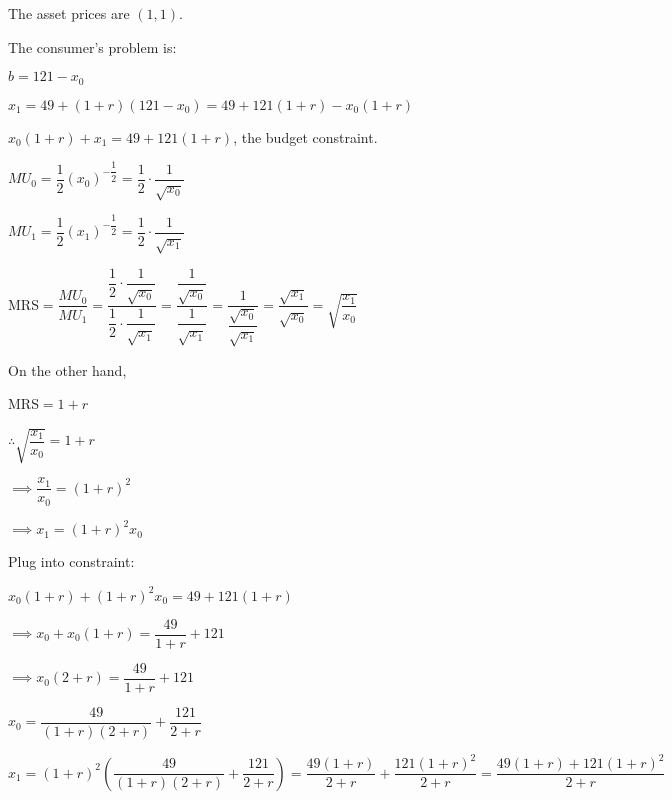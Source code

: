\documentclass{article}
\begin{document}
The asset prices are $(1,1)$.

The consumer's problem is:


$b=121-x_{0}$

$x_{1}=49+\left(1+r\right)\left(121-x_{0}\right)=49+121\left(1+r\right)-x_{0}\left(1+r\right)$

$x_{0}\left(1+r\right)+x_{1}=49+121\left(1+r\right)$, the budget constraint.

$MU_{0}=\dfrac{1}{2}\left(x_{0}\right)^{-\dfrac{1}{2}}=\dfrac{1}{2}\cdot\dfrac{1}{\sqrt{x_{0}}}$

$MU_{1}=\dfrac{1}{2}\left(x_{1}\right)^{-\dfrac{1}{2}}=\dfrac{1}{2}\cdot\dfrac{1}{\sqrt{x_{1}}}$

MRS$=\dfrac{MU_{0}}{MU_{1}}=\dfrac{\dfrac{1}{2}\cdot\dfrac{1}{\sqrt{x_{0}}}}{\dfrac{1}{2}\cdot\dfrac{1}{\sqrt{x_{1}}}}=\dfrac{\dfrac{1}{\sqrt{x_{0}}}}{\dfrac{1}{\sqrt{x_{1}}}}=\dfrac{1}{\dfrac{\sqrt{x_{0}}}{\sqrt{x_{1}}}}=\dfrac{\sqrt{x_{1}}}{\sqrt{x_{0}}}=\sqrt{\dfrac{x_{1}}{x_{0}}}$

On the other hand,

MRS$=1+r$

$\therefore\sqrt{\dfrac{x_{1}}{x_{0}}}=1+r$

$\implies \dfrac{x_{1}}{x_{0}}=\left(1+r\right)^{2}$

$\implies x_{1}=\left(1+r\right)^{2}x_{0}$

Plug into constraint:

$x_{0}\left(1+r\right)+\left(1+r\right)^{2}x_{0}=49+121\left(1+r\right)$

$\implies x_{0}+x_{0}\left(1+r\right)=\dfrac{49}{1+r}+121$

$\implies x_{0}\left(2+r\right)=\dfrac{49}{1+r}+121$

$x_{0}=\dfrac{49}{\left(1+r\right)\left(2+r\right)}+\dfrac{121}{2+r}$

$x_{1}=\left(1+r\right)^{2}\left(\dfrac{49}{\left(1+r\right)\left(2+r\right)}+\dfrac{121}{2+r}\right)=\dfrac{49\left(1+r\right)}{2+r}+\dfrac{121\left(1+r\right)^{2}}{2+r}=\dfrac{49\left(1+r\right)+121\left(1+r\right)^{2}}{2+r}$
\end{document}

